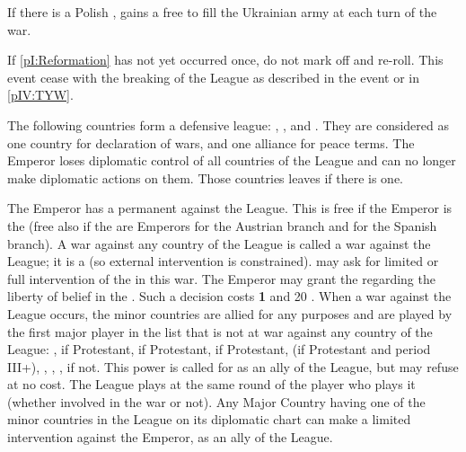 \phadm
\aparag If there is a Polish \paysUkraine, \POL gains a free \ARMY\facemoins
to fill the Ukrainian army at each turn of the war.










\condition{}
\aparag If \ref{pI:Reformation} has not yet occurred once, do not mark off and
re-roll.
\aparag This event cease with the breaking of the League as described in the
event or in \ref{pIV:TYW}.

\phevnt
\aparag The following countries form a defensive league: \paysHesse,
\paysSaxe, \paysThuringe and \paysWurtemberg. They are considered as one
country for declaration of wars, and one alliance for peace terms.
\aparag The Emperor loses diplomatic control of all countries of the League
and can no longer make diplomatic actions on them. Those countries leaves \GE
if there is one.

\phdipl
\aparag The Emperor has a permanent \CB against the League. This \CB is free
if the Emperor is the \SDCF (free \CB also if the \HAB are Emperors for the
Austrian branch and \SDCF for the Spanish branch). A war against any country
of the League is called a war against the League; it is a  (so external intervention is constrained).
\bparag \SPA may ask for limited or full intervention of the \HAB in this war.
\aparag The Emperor may grant the  regarding the
liberty of belief in the \HRE. Such a decision costs {\bf 1} \STAB and 20 \VP.
\aparag When a war against the League occurs, the minor countries are allied
for any purposes and are played by the first major player in the list that is
not at war against any country of the League: \HOL, \ENG if Protestant, \FRA
if Protestant, \POL if Protestant, \SUE (if Protestant and period III+), \SPA,
\ENG, \FRA, \POL if not. This power is called for as an ally of the League,
but may refuse at no cost. The League plays at the same round of the player
who plays it (whether involved in the war or not).
\aparag Any Major Country having one of the minor countries in the League on
its diplomatic chart can make a limited intervention against the Emperor, as
an ally of the League.


